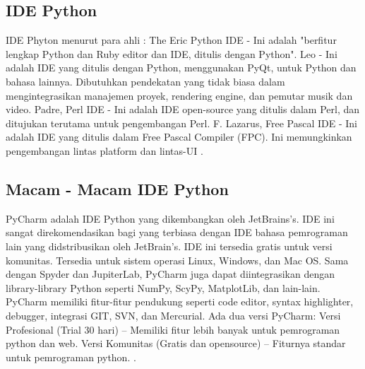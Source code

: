 \subsection{IDE Python}
IDE Phyton menurut para ahli :
The Eric Python IDE - Ini adalah "berfitur lengkap Python dan Ruby editor dan IDE, ditulis dengan Python".
Leo - Ini adalah IDE yang ditulis dengan Python, menggunakan PyQt, untuk Python dan bahasa lainnya. Dibutuhkan pendekatan yang tidak biasa dalam mengintegrasikan manajemen proyek, rendering engine, dan pemutar musik dan video.
Padre, Perl IDE - Ini adalah IDE open-source yang ditulis dalam Perl, dan ditujukan terutama untuk pengembangan Perl.
 F. Lazarus, Free Pascal IDE - Ini adalah IDE yang ditulis dalam Free Pascal Compiler (FPC). Ini memungkinkan pengembangan lintas platform dan lintas-UI \cite{swarnkar2013survey}.

\subsection{Macam - Macam IDE Python}
PyCharm adalah IDE Python yang dikembangkan oleh JetBrains’s. IDE ini sangat direkomendasikan bagi yang terbiasa dengan IDE bahasa pemrograman lain yang didstribusikan oleh JetBrain’s. IDE ini tersedia gratis untuk versi komunitas. Tersedia untuk sistem operasi Linux, Windows, dan Mac OS. Sama dengan Spyder dan JupiterLab, PyCharm juga dapat diintegrasikan dengan library-library Python seperti NumPy, ScyPy, MatplotLib, dan lain-lain. PyCharm memiliki fitur-fitur pendukung seperti code editor, syntax highlighter, debugger, integrasi GIT, SVN, dan Mercurial.
Ada dua versi PyCharm:
Versi Profesional (Trial 30 hari) – Memiliki fitur lebih banyak untuk pemrograman python dan web.
Versi Komunitas (Gratis dan opensource) – Fiturnya standar untuk pemrograman python. \cite{tateosian2015beginning}.


